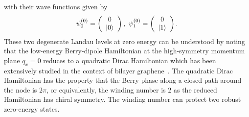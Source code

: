 \documentclass[aps,prl,twocolumn,longbibliography]{revtex4-1}
\begin{document}
\begin{widetext}
with their wave functions given by
\begin{eqnarray}
	\psi_{0}^{(0)}=\left(\begin{array}{c}
		0\\
		\ket{0}\\
	\end{array}\right),\
	\psi_{1}^{(0)}=\left(\begin{array}{c}
		0\\
		\ket{1}\\
	\end{array}\right).
\end{eqnarray}
These two degenerate Landau levels at zero energy can be understood by noting  that the low-energy Berry-dipole Hamiltonian
at the high-symmetry momentum plane $q_{x}=0$ reduces to a quadratic Dirac Hamiltonian which has been
extensively studied in the context of bilayer graphene~\cite{Novoselov2006}. The quadratic Dirac Hamiltonian has the property that the Berry phase along a closed path around the node is $2\pi$, or equivalently, the winding number is $2$ as the reduced Hamiltonian has chiral symmetry.
The winding number can protect two robust zero-energy states.


\end{widetext}
\end{document}
